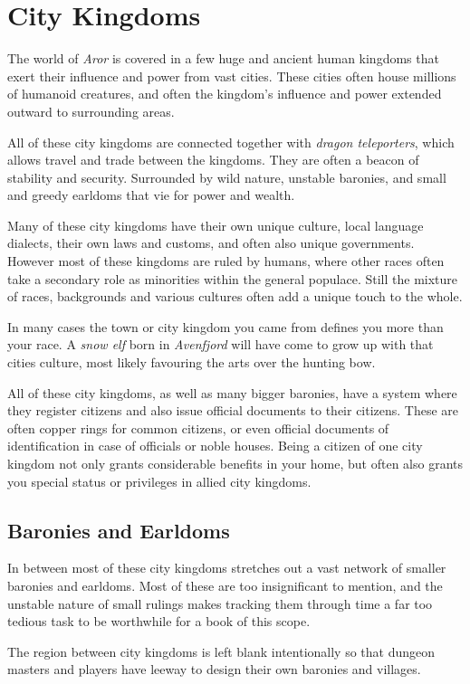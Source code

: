 \section*{City Kingdoms}

The world of \emph{Aror} is covered in a few huge and ancient human kingdoms
that exert their influence and power from vast cities. These cities often house
millions of humanoid creatures, and often the kingdom's influence and power
extended outward to surrounding areas.

All of these city kingdoms are connected together with \emph{dragon
  teleporters}, which allows travel and trade between the kingdoms. They are
often a beacon of stability and security. Surrounded by wild nature, unstable
baronies, and small and greedy earldoms that vie for power and wealth.

Many of these city kingdoms have their own unique culture, local language
dialects, their own laws and customs, and often also unique governments. However
most of these kingdoms are ruled by humans, where other races often take a
secondary role as minorities within the general populace. Still the mixture
of races, backgrounds and various cultures often add a unique touch to the
whole.

In many cases the town or city kingdom you came from defines you more than
your race. A \emph{snow elf} born in \emph{Avenfjord} will have come to grow
up with that cities culture, most likely favouring the arts over the hunting
bow.

All of these city kingdoms, as well as many bigger baronies, have a system
where they register citizens and also issue official documents to their
citizens. These are often copper rings for common citizens, or even official
documents of identification in case of officials or noble houses. Being a
citizen of one city kingdom not only grants considerable benefits in your
home, but often also grants you special status or privileges in allied city
kingdoms.

\subsection*{Baronies and Earldoms}

In between most of these city kingdoms stretches out a vast network of smaller
baronies and earldoms. Most of these are too insignificant to mention, and the
unstable nature of small rulings makes tracking them through time a far too
tedious task to be worthwhile for a book of this scope.


\begin{note}
  The region between city kingdoms is left blank intentionally so that dungeon
  masters and players have leeway to design their own baronies and villages.
\end{note}






